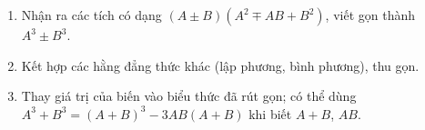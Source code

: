 \begin{enumerate}
\item Nhận ra các tích có dạng $(A\pm B)(A^2\mp AB+B^2)$, viết gọn thành $A^3\pm B^3$.
\item Kết hợp các hằng đẳng thức khác (lập phương, bình phương), thu gọn.
\item Thay giá trị của biến vào biểu thức đã rút gọn; có thể dùng $A^3+B^3=(A+B)^3-3AB(A+B)$ khi biết $A+B$, $AB$.
\end{enumerate}
